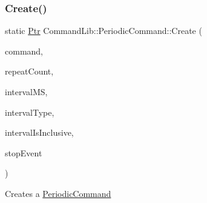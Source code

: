 \subsubsection{\texorpdfstring{Create()}{Create()}\hspace{0.1cm}{\footnotesize\ttfamily [4/4]}}
{\footnotesize\ttfamily static \mbox{\hyperlink{class_command_lib_1_1_command_a3b3e4f00144373299df5c6bb1acc319d}{Ptr}} Command\+Lib\+::\+Periodic\+Command\+::\+Create (\begin{DoxyParamCaption}\item[{\mbox{\hyperlink{class_command_lib_1_1_command_a3b3e4f00144373299df5c6bb1acc319d}{Command\+::\+Ptr}}}]{command,  }\item[{size\+\_\+t}]{repeat\+Count,  }\item[{long long}]{interval\+MS,  }\item[{\mbox{\hyperlink{class_command_lib_1_1_periodic_command_ac32ef93cf679cd652da30a0ad373d31e}{Interval\+Type}}}]{interval\+Type,  }\item[{bool}]{interval\+Is\+Inclusive,  }\item[{\mbox{\hyperlink{class_command_lib_1_1_waitable_ac74b6b91e48220146eada76a31cf2d9b}{Waitable\+::\+Ptr}}}]{stop\+Event }\end{DoxyParamCaption})\hspace{0.3cm}{\ttfamily [static]}}



Creates a \mbox{\hyperlink{class_command_lib_1_1_periodic_command}{Periodic\+Command}} 


